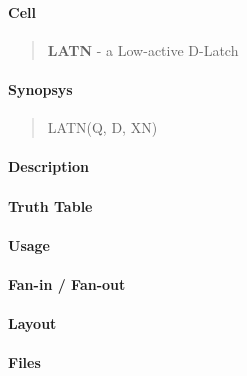 \label{LATN}
\paragraph{Cell}
\begin{quote}
    \textbf{LATN} - a Low-active D-Latch
\end{quote}

\paragraph{Synopsys}
\begin{quote}
    LATN(Q, D, XN)
\end{quote}

\paragraph{Description}

%

\paragraph{Truth Table}
%

\paragraph{Usage}

\paragraph{Fan-in / Fan-out}

\paragraph{Layout}

\paragraph{Files}

\clearpage

